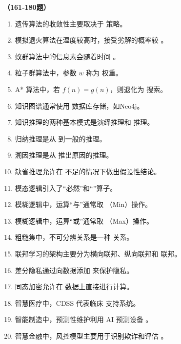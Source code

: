 \vspace{1em}
\textbf{（161-180题）}
\begin{enumerate}[resume,leftmargin=2em,itemsep=1pt]
\item 遗传算法的收敛性主要取决于 \underline{\hspace{3em}} 策略。
\item 模拟退火算法在温度较高时，接受劣解的概率较 \underline{\hspace{3em}}。
\item 蚁群算法中的信息素会随着时间 \underline{\hspace{3em}}。
\item 粒子群算法中，参数 $w$ 称为 \underline{\hspace{3em}} 权重。
\item A* 算法中，若 $f(n)=g(n)$，则退化为 \underline{\hspace{3em}} 搜索。
\item 知识图谱通常使用 \underline{\hspace{3em}} 数据库存储，如Neo4j。
\item 知识推理的两种基本模式是演绎推理和 \underline{\hspace{3em}} 推理。
\item 归纳推理是从 \underline{\hspace{3em}} 到一般的推理。
\item 溯因推理是从 \underline{\hspace{3em}} 推出原因的推理。
\item 缺省推理允许在 \underline{\hspace{3em}} 不足的情况下做出假设性结论。
\item 模态逻辑引入了“必然”和“\underline{\hspace{3em}}”算子。
\item 模糊逻辑中，运算“与”通常取 \underline{\hspace{3em}}（Min）操作。
\item 模糊逻辑中，运算“或”通常取 \underline{\hspace{3em}}（Max）操作。
\item 粗糙集中，不可分辨关系是一种 \underline{\hspace{3em}} 关系。
\item 联邦学习的架构主要分为横向联邦、纵向联邦和 \underline{\hspace{3em}} 联邦。
\item 差分隐私通过向数据添加 \underline{\hspace{3em}} 来保护隐私。
\item 同态加密允许在 \underline{\hspace{3em}} 数据上直接进行计算。
\item 智慧医疗中，CDSS 代表临床 \underline{\hspace{3em}} 支持系统。
\item 智能制造中，预测性维护利用 AI 预测设备 \underline{\hspace{3em}}。
\item 智慧金融中，风控模型主要用于识别欺诈和评估 \underline{\hspace{3em}}。
\end{enumerate}

